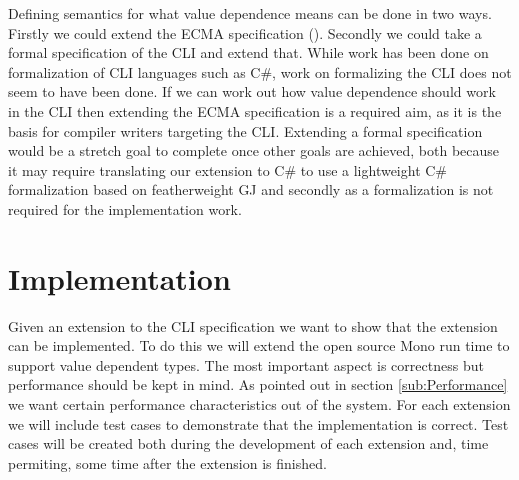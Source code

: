 \documentclass[english]{report}
\begin{document}
Defining semantics for what value dependence means can be done in
two ways. Firstly we could extend the ECMA specification (\cite{ecma-335}).
Secondly we could take a formal specification of the CLI and extend
that. While work has been done on formalization of CLI languages such
as C\#, work on formalizing the CLI does not seem to have been done.
If we can work out how value dependence should work in the CLI then
extending the ECMA specification is a required aim, as it is the basis
for compiler writers targeting the CLI. Extending a formal specification
would be a stretch goal to complete once other goals are achieved,
both because it may require translating our extension to C\# to use
a lightweight C\# formalization based on featherweight GJ and secondly
as a formalization is not required for the implementation work.


\section{Implementation}

Given an extension to the CLI specification we want to show that the
extension can be implemented. To do this we will extend the open source
Mono run time to support value dependent types. The most important
aspect is correctness but performance should be kept in mind. As pointed
out in section \ref{sub:Performance} we want certain performance
characteristics out of the system. For each extension we will include
test cases to demonstrate that the implementation is correct. Test
cases will be created both during the development of each extension
and, time permiting, some time after the extension is finished.





\end{document}
